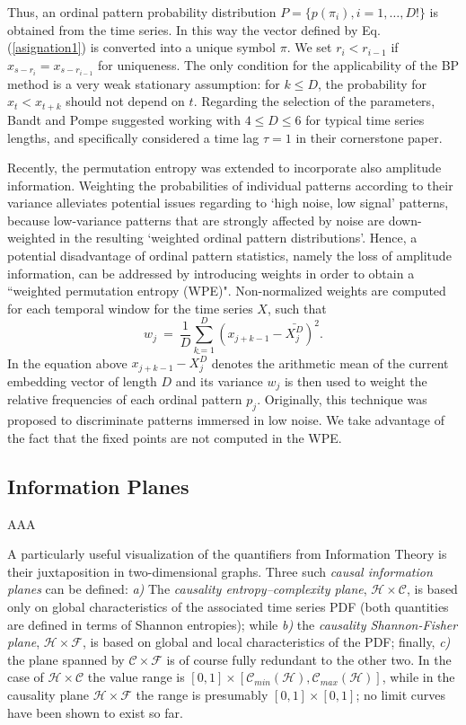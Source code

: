 Thus, an ordinal pattern probability distribution $P = \{ p(\pi_i), i = 1, \dots, D! \}$ is obtained from the time series.
In this way the vector defined by Eq. (\ref{asignation1}) is converted into a unique symbol $\pi$.
We set $r_i < r_{i-1}$ if $x_{s-r_{i}} = x_{s-r_{i-1}}$ for uniqueness.
The only condition for the applicability of the BP method is a very weak stationary assumption: for $k \leq D$, the probability for $x_t < x_{t+k}$ should not depend on $t$.
Regarding the selection of the parameters, Bandt and Pompe suggested working with $4 \leq D \leq 6$ for typical time series lengths, and specifically considered a time lag $\tau = 1$ in their cornerstone paper.

Recently, the permutation entropy was extended to incorporate also amplitude information.
Weighting the probabilities of individual patterns according to their variance alleviates potential issues regarding to ‘high noise, low signal’ patterns, because low-variance patterns that are strongly affected by noise are down-weighted in the resulting ‘weighted ordinal pattern distributions’.
Hence, a potential disadvantage of ordinal pattern statistics, namely the loss of amplitude information, can be addressed by introducing weights in order to obtain a ``weighted permutation entropy (WPE)".
Non-normalized weights are computed for each temporal window for the time series $X$, such that
\begin{equation}
\label{WPE_weigth}
w_j~=~\frac{1}{D}\sum_{k=1}^{D} \left(x_{j+k-1}-\bar{X_j^D}\right)^2.
\end{equation}
In the equation above $x_{j+k-1}-\bar{X_j^D}$ denotes the arithmetic mean of the current embedding vector of length $D$ and its variance $w_j$ is then used to weight the relative frequencies of each ordinal pattern $p_j$.
Originally, this technique was proposed to discriminate patterns immersed in low noise.
We take advantage of the fact that the fixed points are not computed in the WPE.

\subsection{Information Planes}

AAA

A particularly useful visualization of the quantifiers from Information Theory is their juxtaposition in two-dimensional graphs. Three  such \textit{causal information planes} can be defined: 
{\it a)\/} The {\it causality entropy--complexity plane\/}, ${\mathcal H} \times {\mathcal C}$, is based 
only on global characteristics of the associated time series PDF (both quantities are defined in terms of 
Shannon entropies); while 
{\it b)\/} the {\it causality Shannon-Fisher plane\/}, ${\mathcal H} \times {\mathcal F}$, is based on 
global and local characteristics of the PDF; finally, {\it c)\/} the plane spanned by ${\mathcal C} \times {\mathcal F}$ is of course fully redundant to the other two.  
In the case of ${\mathcal H} \times {\mathcal C}$ the value range is $[0, 1] \times [{\mathcal C}_{min}(\mathcal{H}), 
{\mathcal C}_{max}(\mathcal{H})]$, while in the causality 
plane ${\mathcal H} \times {\mathcal F}$ the range is presumably $[0, 1]\times [0, 1]$; no limit curves have been shown to exist so far.

